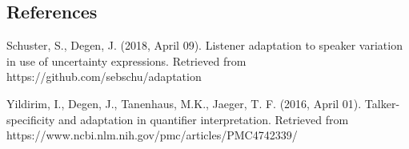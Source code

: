 \documentclass{sp}          %
\begin{document}
\subsection{References}

\begin{indent}Schuster, S., Degen, J. (2018, April 09). Listener adaptation to speaker variation in use of uncertainty expressions. Retrieved from https://github.com/sebschu/adaptation
\end{indent}

Yildirim, I., Degen, J., Tanenhaus, M.K., Jaeger, T. F. (2016, April 01). Talker-specificity and adaptation in quantifier interpretation. Retrieved from https://www.ncbi.nlm.nih.gov/pmc/articles/PMC4742339/

\printbibliography
%




\end{document}

